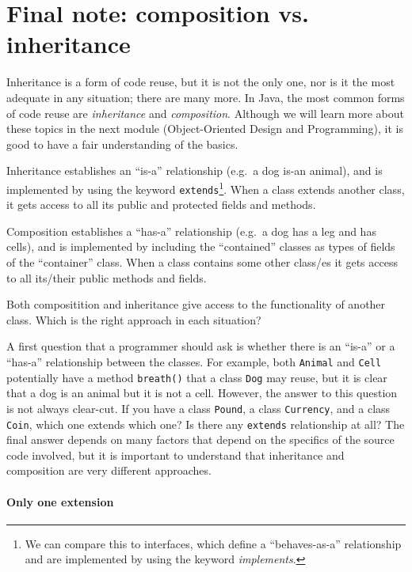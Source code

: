 \section{Final note: composition vs. inheritance}
\label{sec:final-note:-comp}

Inheritance is a form of code reuse, but it is not the only one, nor
is it the most adequate in any situation; there are many more. In
Java, the most common forms of code reuse are \emph{inheritance} and
\emph{composition}. Although we will learn more about these topics in
the next module (Object-Oriented Design and Programming), it is good
to have a fair understanding of the basics. 

Inheritance establishes an ``is-a'' relationship (e.g.~a dog is-an 
animal), and is implemented by
using the keyword \verb+extends+\footnote{We can compare this to
  interfaces, which define a ``behaves-as-a'' relationship and are
  implemented by using the keyword \emph{implements}.}. 
When a class extends another class,
it gets access to all its public and protected fields and methods. 

Composition establishes a ``has-a'' relationship (e.g.~a dog has a leg
and has cells), and is implemented by including the ``contained''
classes as types of fields of the ``container'' class.  When a class
contains some other class/es it gets access to all its/their public methods
and fields. 

Both compositition and inheritance give access to the functionality of
another class. Which is the right approach in each situation? 

A first
question that a programmer should ask is whether there is an ``is-a''
or a ``has-a'' relationship between the classes. For example, both
\verb+Animal+ and \verb+Cell+ potentially have a method
\verb+breath()+ that a class \verb+Dog+ may reuse, but it is clear
that a dog is an animal but it is not a cell. However, the answer to
this question is not
always clear-cut. If you have a class \verb+Pound+, a class
\verb+Currency+, and a class \verb+Coin+, which one extends which one?
Is there any \verb+extends+ relationship at all? The final answer
depends on many factors that depend on the specifics of the source
code involved, but it is important to understand that inheritance and
composition are very different approaches. 

\paragraph{Only one extension}
\label{sec:only-one-extension}

